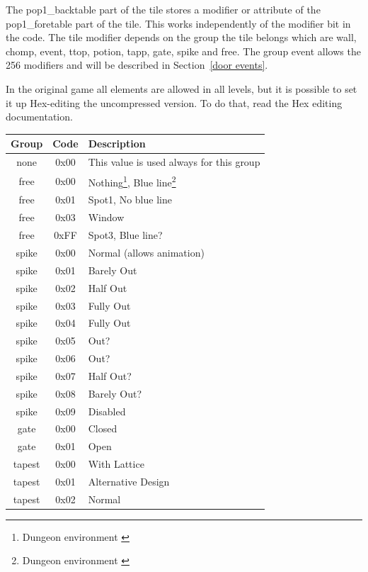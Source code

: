 \documentclass{article}
\begin{document}
 The pop1\_backtable part of the tile stores a modifier or attribute of the
 pop1\_foretable part of the tile. This works independently of the modifier
 bit in the code. The tile modifier depends on the group the tile belongs
 which are wall, chomp, event, ttop, potion, tapp, gate, spike and free.
 The group event allows the 256 modifiers and will be described in Section~\ref{door events}.
 
 In the original game all elements are allowed in all levels, but it is possible to set it up
Hex-editing the uncompressed version. To do that, read the Hex editing documentation.

\begin{table}
\begin{tabular}{ccl}
\hline
 Group & Code & Description \\
\hline
 none  & 0x00 & This value is used always for this group \\
 free  & 0x00 & Nothing\footnote[1]{Dungeon environment \label{id:de}}, Blue line\footnote[2]{Dungeon environment \label{id:pe}} \\
 free  & 0x01 & Spot1\footnotemark[1], No blue line\footnotemark[2] \\
 free  & 0x03 & Window \\
 free  & 0xFF & Spot3\footnotemark[1], Blue line?\footnotemark[2] \\
 spike & 0x00 & Normal (allows animation) \\
 spike & 0x01 & Barely Out \\
 spike & 0x02 & Half Out \\
 spike & 0x03 & Fully Out \\
 spike & 0x04 & Fully Out \\
 spike & 0x05 & Out? \\
 spike & 0x06 & Out? \\
 spike & 0x07 & Half Out? \\
 spike & 0x08 & Barely Out? \\
 spike & 0x09 & Disabled \\
 gate  & 0x00 & Closed \\
 gate  & 0x01 & Open \\
 tapest & 0x00 & With Lattice\footnotemark[2] \\
 tapest & 0x01 & Alternative Design\footnotemark[2] \\
 tapest & 0x02 & Normal\footnotemark[2] \\

\end{tabular}
\end{table}
\end{document}
